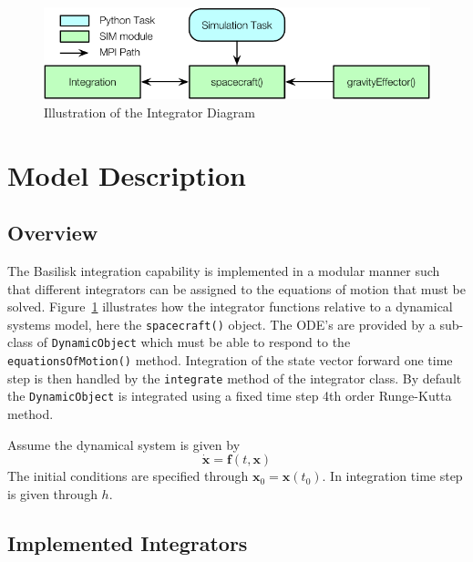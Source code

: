 

\begin{figure}[htb]
	\centerline{
	\includegraphics[]{Figures/integratorDiagram}
	}
	\caption{Illustration of the Integrator Diagram}
	\label{fig:intDiag}
\end{figure}


\section{Model Description}

\subsection{Overview}
The Basilisk integration capability is implemented in a modular manner such that different integrators can be assigned to the equations of motion that must be solved.  Figure~\ref{fig:intDiag} illustrates how the integrator functions relative to a dynamical systems model, here the {\tt spacecraft()} object.  The ODE's are provided by a sub-class of {\tt DynamicObject} which must be able to respond to the {\tt equationsOfMotion()} method.  Integration of the state vector forward one time step is then handled by the {\tt integrate} method of the integrator class.  By default the {\tt DynamicObject} is integrated using a fixed time step 4th order Runge-Kutta method.

Assume the dynamical system is given by
\begin{equation}
	\dot{\bm x} = \bm f(t, \bm x)
\end{equation}
The initial conditions are specified through $\bm x_{0} = \bm x(t_{0})$.  In integration time step is given through $h$.  

\subsection{Implemented Integrators}

